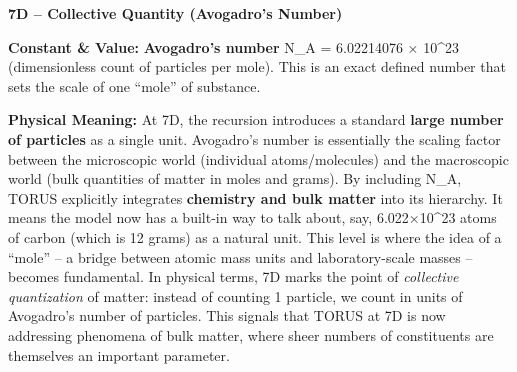 \documentclass[
]{article}
\begin{document}
\textbf{7D -- Collective Quantity (Avogadro's Number)}

\textbf{Constant \& Value:} \textbf{Avogadro's number} N\_A = 6.02214076
× 10\^{}23 (dimensionless count of particles per mole)\hspace{0pt}. This
is an exact defined number that sets the scale of one ``mole'' of
substance.

\textbf{Physical Meaning:} At 7D, the recursion introduces a standard
\textbf{large number of particles} as a single unit. Avogadro's number
is essentially the scaling factor between the microscopic world
(individual atoms/molecules) and the macroscopic world (bulk quantities
of matter in moles and grams)\hspace{0pt}. By including N\_A, TORUS
explicitly integrates \textbf{chemistry and bulk matter} into its
hierarchy. It means the model now has a built-in way to talk about, say,
6.022×10\^{}23 atoms of carbon (which is 12 grams) as a natural unit.
This level is where the idea of a ``mole'' -- a bridge between atomic
mass units and laboratory-scale masses -- becomes fundamental. In
physical terms, 7D marks the point of \emph{collective quantization} of
matter: instead of counting 1 particle, we count in units of Avogadro's
number of particles. This signals that TORUS at 7D is now addressing
phenomena of bulk matter, where sheer numbers of constituents are
themselves an important parameter.
\end{document}
